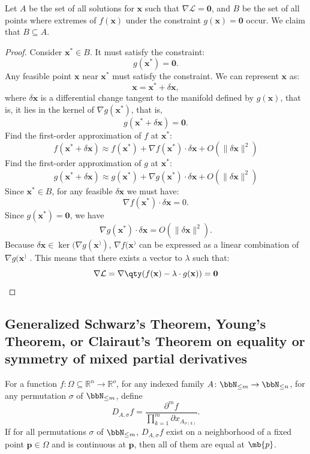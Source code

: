  Let $A$ be the set of all solutions for \( \mathbf{x} \) such that $\nabla \mathcal{L} = \mathbf{0}$, and $B$ be the set of all points where extremes of \( f(\mathbf{x}) \) under the constraint \( g(\mathbf{x}) = \mathbf{0}\) occur. We claim that $B\subseteq A$.
\begin{proof}
Consider $\mathbf{x}^*\in B$. It must satisfy the constraint:
\[g(\mathbf{x}^*) = \mathbf{0}.\]
Any feasible point $\mathbf{x}$ near $\mathbf{x}^*$ must satisfy the constraint. We can represent $\mathbf{x}$ as:
\[\mathbf{x} = \mathbf{x}^* + \delta\mathbf{x},\]
where $\delta\mathbf{x}$ is a differential change tangent to the manifold defined by $g(\mathbf{x})$, that is, it lies in the kernel of $\nabla g(\mathbf{x}^*)$, that is,
\[g(\mathbf{x}^* + \delta\mathbf{x}) = \mathbf{0}.\]
Find the first-order approximation of $f$ at $\mathbf{x}^*$:
\[f(\mathbf{x}^*+ \delta\mathbf{x}) \approx f(\mathbf{x}^*) + \nabla f(\mathbf{x}^*) \cdot \delta\mathbf{x} + O(\|\delta\mathbf{x}\|^2)\]
Find the first-order approximation of $g$ at $\mathbf{x}^*$:
\[g(\mathbf{x}^*+ \delta\mathbf{x}) \approx g(\mathbf{x}^*) + \nabla g(\mathbf{x}^*) \cdot \delta\mathbf{x} + O(\|\delta\mathbf{x}\|^2)\]
Since $\mathbf{x}^*\in B$, for any feasible $\delta\mathbf{x}$ we must have:
\[\nabla f(\mathbf{x}^*) \cdot \delta\mathbf{x} = 0.\]
Since $g(\mathbf{x}^*) = \mathbf{0}$, we have
\[\nabla g(\mathbf{x}^*) \cdot \delta\mathbf{x} = O(\|\delta\mathbf{x}\|^2).\]
Because \( \delta\mathbf{x} \in \ker(\nabla g(\mathbf{x}^)) \), \( \nabla f(\mathbf{x}^) \) can be expressed as a linear combination of \( \nabla g(\mathbf{x}^) \) . This means that there exists a vector to $\lambda$ such that:
\[\nabla\mathcal{L} = \nabla \qty(f(\mathbf{x}) - \lambda \cdot g(\mathbf{x})) = \mathbf{0} \]
\end{proof}
\subsection{Generalized Schwarz's Theorem, Young's Theorem, or Clairaut's Theorem on equality or symmetry of mixed partial derivatives}
For a function $f\colon\Omega\subseteq\mathbb{R}^n\to\mathbb{R}^o$, for any indexed family $A\colon\bbN_{\leq m}\to\bbN_{\leq n}$, for any permutation $\sigma$ of $\bbN_{\leq m}$, define
\[D_{A,\sigma}f=\frac{\partial^mf}{\prod_{k=1}^m\partial x_{A_{\sigma(k)}}}.\]
If for all permutations $\sigma$ of $\bbN_{\leq m}$, $D_{A,\sigma}f$ exist on a neighborhood of a fixed point $\mathbf{p}\in\Omega$ and is continuous at $\mathbf{p}$, then all of them are equal at $\mb{p}$.
